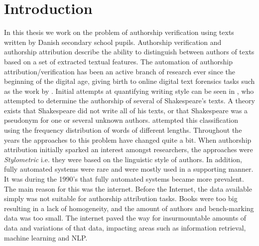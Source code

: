 %

\section{Introduction} \label{sec:introduction}


In this thesis we work on the problem of authorship verification using texts
written by Danish secondary school pupils. Authorship verification and
authorship attribution describe the ability to distinguish between authors
of texts based on a set of extracted textual features. The automation of
authorship attribution/verification has been an active branch of research ever
since the beginning of the digital age, giving birth to online digital text
forensics tasks such as the work by \citet{pan:2015}. Initial attempts at
quantifying writing style can be seen in \citet{Mendenhall237}, who attempted
to determine the authorship of several of Shakespeare's texts. A theory exists
that Shakespeare did not write all of his texts, or that Shakespeare was a
pseudonym for one or several unknown authors. \citet{Mendenhall237} attempted
this classification using the frequency distribution of words of different
lengths. Throughout the years the approaches to this problem have changed
quite a bit. When authorship attribution initially sparked an interest amongst
researchers, the approaches were \textit{Stylometric} i.e. they were based on
the linguistic style of authors. In addition, fully automated systems
were rare and were mostly used in a supporting manner. It was during the 1990's
that fully automated systems became more prevalent. The main reason for this was
the internet. Before the Internet, the data available simply was not suitable
for authorship attribution tasks. Books were too big resulting in a lack of
homogeneity, and the amount of authors and bench-marking data was too small.
The internet paved the way for insurmountable amounts of data and variations of
that data, impacting areas such as information retrieval, machine learning and
\gls{NLP}.\cite{stamatos2009}


